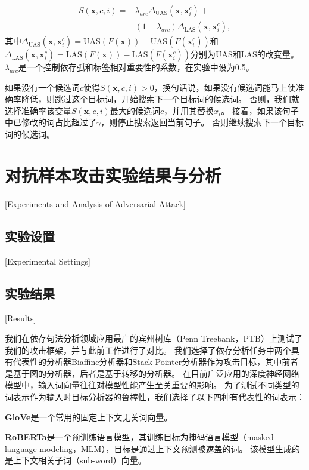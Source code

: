 \begin{equation}
	\begin{aligned}
		\label{eq:mis-inc}
		S(\bm{x},c,i) = & \lambda_{arc}\Delta_\text{UAS}(\bm{x},\bm{x}^c_{i}) + \\ 
		& (1-\lambda_{arc})\Delta_\text{LAS}(\bm{x},\bm{x}^c_{i}),
	\end{aligned}
\end{equation}
其中$\Delta_\text{UAS}(\bm{x},\bm{x}^c_{i}) = \text{UAS}(F(\bm{x})) - \text{UAS}(F(\bm{x}^c_{i})) $和$\Delta_\text{LAS}(\bm{x},\bm{x}^c_{i}) = \text{LAS}(F(\bm{x})) - \text{LAS}(F(\bm{x}^c_{i}))$分别为UAS和LAS的改变量。 
$\lambda_{arc}$是一个控制依存弧和标签相对重要性的系数，在实验中设为0.5。

如果没有一个候选词$c$使得$S(\bm{x},c,i) > 0$，换句话说，如果没有候选词能马上使准确率降低，则跳过这个目标词，开始搜索下一个目标词的候选词。
否则，我们就选择准确率该变量$S(\bm{x},c,i)$最大的候选词$c$，并用其替换$x_i$。
接着，如果该句子中已修改的词占比超过了$\gamma$，则停止搜索返回当前句子。
否则继续搜索下一个目标词的候选词。


\section{对抗样本攻击实验结果与分析}[Experiments and Analysis of Adversarial Attack]


\subsection{实验设置}[Experimental Settings]


\subsection{实验结果}[Results]

我们在依存句法分析领域应用最广的宾州树库（Penn Treebank，PTB）上测试了我们的攻击框架，并与此前工作进行了对比。
我们选择了依存分析任务中两个具有代表性的分析器Biaffine分析器\cite{dozat2017deep}和Stack-Pointer分析器\cite{ma2018stack}作为攻击目标，其中前者是基于图的分析器，后者是基于转移的分析器。
在目前广泛应用的深度神经网络模型中，输入词向量往往对模型性能产生至关重要的影响。
为了测试不同类型的词表示作为输入时目标分析器的鲁棒性，我们选择了以下四种有代表性的词表示：

\textbf{GloVe}\cite{pennington2014glove}是一个常用的固定上下文无关词向量。

\textbf{RoBERTa}\cite{liu2019roberta}是一个预训练语言模型，其训练目标为掩码语言模型（masked language modeling，MLM），目标是通过上下文预测被遮盖的词。 该模型生成的是上下文相关子词（sub-word）向量。

